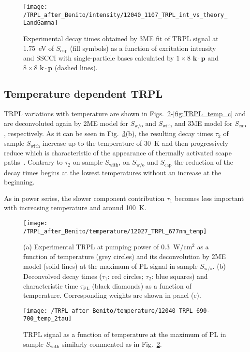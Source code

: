 \begin{figure}
	\centering
	\texttt{[image: /TRPL\_after\_Benito/intensity/12040\_1107\_TRPL\_int\_vs\_theory\_LandGamma]}
	\caption{Experimental decay times obtained by 3ME fit of TRPL signal at 1.75~eV of $S_\mathrm{cap}$ (fill symbols) as a function of excitation intensity and SSCCI with single-particle bases calculated by $1\times8$ $\mathbf{k\cdot p}$ and $8\times8$ $\mathbf{k\cdot p}$ (dashed lines).}
	\label{fig:TRPL_int_c_theory}
\end{figure}


\clearpage
\subsection{Temperature dependent TRPL}
TRPL variations with temperature are shown in Figs.~\ref{fig:TRPL_temp_wo}-\ref{fig:TRPL_temp_c} and are deconvoluted again by 2ME model for $S_\mathrm{w/o}$ and $S_\mathrm{with}$ and 3ME model for $S_\mathrm{cap}$, respectively. As it can be seen in Fig.~\ref{fig:TRPL_temp_w}(b), the resulting decay times $\tau_2$ of sample $S_\mathrm{with}$ increase up to the temperature of 30~K and then progressively reduce which is characteristic of the appearance of thermally activated scape paths~\citep{Manna_apl2012_TRPLtype2}. Contrary to $\tau_2$ on sample $S_\mathrm{with}$, on $S_\mathrm{w/o}$ and $S_\mathrm{cap}$ the reduction of the decay times begins at the lowest temperatures without an increase at the beginning.

As in power series, the slower component contribution $\tau_1$ becomes less important with increasing temperature and around 100~K.
%
\begin{figure}
	\centering
	\texttt{[image: /TRPL\_after\_Benito/temperature/12027\_TRPL\_677nm\_temp]}
	\caption{(a) Experimental TRPL at pumping power of 0.3~W/cm$^2$ as a function of temperature (grey circles) and its deconvolution by 2ME model (solid lines) at the maximum of PL signal in sample $S_\mathrm{w/o}$. (b) Deconvolved decay times ($\tau_1$: red circles; $\tau_2$: blue squares) and characteristic time $\tau_\mathrm{PL}$ (black diamonds) as a function of temperature. Corresponding weights are shown in panel (c).}
	\label{fig:TRPL_temp_wo}
\end{figure}
%
\begin{figure}
	\centering
	\texttt{[image: /TRPL\_after\_Benito/temperature/12040\_TRPL\_690-700\_temp\_2tau]}
	\caption{TRPL signal as a function of temperature at the maximum of PL in sample $S_\mathrm{with}$ similarly commented as in Fig.~\ref{fig:TRPL_temp_wo}.}
	\label{fig:TRPL_temp_w}
\end{figure}
%

